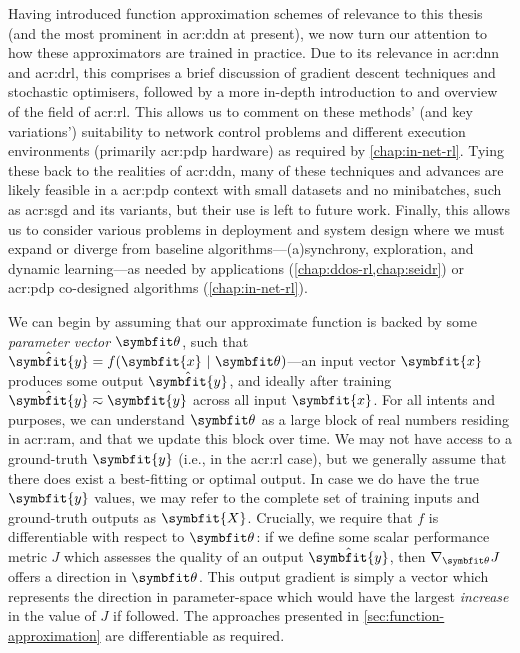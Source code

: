 Having introduced function approximation schemes of relevance to this thesis (and the most prominent in \gls{acr:ddn} at present), we now turn our attention to how these approximators are trained in practice.
Due to its relevance in \gls{acr:dnn} and \gls{acr:drl}, this comprises a brief discussion of gradient descent techniques and stochastic optimisers, followed by a more in-depth introduction to and overview of the field of \gls{acr:rl}.
This allows us to comment on these methods' (and key variations') suitability to network control problems and different execution environments (primarily \gls{acr:pdp} hardware) as required by \cref{chap:in-net-rl}.
Tying these back to the realities of \gls{acr:ddn}, many of these techniques and advances are likely feasible in a \gls{acr:pdp} context with small datasets and no minibatches, such as \gls{acr:sgd} and its variants, but their use is left to future work.
Finally, this allows us to consider various problems in deployment and system design where we must expand or diverge from baseline algorithms---(a)synchrony,  exploration, and dynamic learning---as needed by applications (\cref{chap:ddos-rl,chap:seidr}) or \gls{acr:pdp} co-designed algorithms (\cref{chap:in-net-rl}).

We can begin by assuming that our approximate function is backed by some \emph{parameter vector} $\wvec{}$, such that $\hat{\symbfit{y}} = f{\left(\symbfit{x}~|~\wvec{}\right)}$---an input vector $\symbfit{x}$ produces some output $\hat{\symbfit{y}}$, and ideally after training $\hat{\symbfit{y}}\eqsim\symbfit{y}$ across all input $\symbfit{x}$.
For all intents and purposes, we can understand $\wvec{}$ as a large block of real numbers residing in \gls{acr:ram}, and that we update this block over time.
We may not have access to a ground-truth $\symbfit{y}$ (i.e., in the \gls{acr:rl} case), but we generally assume that there does exist a best-fitting or optimal output.
In case we do have the true $\symbfit{y}$ values, we may refer to the complete set of training inputs and ground-truth outputs as $\symbfit{X}$.
Crucially, we require that $f$ is differentiable with respect to $\wvec{}$: if we define some scalar performance metric $J$ which assesses the quality of an output $\hat{\symbfit{y}}$, then $\nabla_{\wvec{}}{J}$ offers a direction in $\wvec{}$.
This output gradient is simply a vector which represents the direction in parameter-space which  would have the largest \emph{increase} in the value of $J$ if followed.
The approaches presented in \cref{sec:function-approximation} are differentiable as required.

